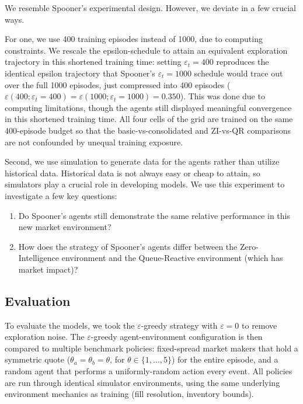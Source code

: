 \documentclass{article}
\begin{document}
We resemble Spooner's experimental design. However, we deviate in a few crucial ways.

For one, we use 400 training episodes instead of 1000, due to computing constraints. We rescale the epsilon-schedule to attain an equivalent exploration trajectory in this shortened training time: setting $\varepsilon_t = 400$ reproduces the identical epsilon trajectory that Spooner's $\varepsilon_t = 1000$ schedule would trace out over the full 1000 episodes, just compressed into 400 episodes ($\varepsilon(400;\varepsilon_t{=}400) = \varepsilon(1000;\varepsilon_t{=}1000) = 0.350$). This was done due to computing limitations, though the agents still displayed meaningful convergence in this shortened training time. All four cells of the grid are trained on the same 400-episode budget so that the basic-vs-consolidated and ZI-vs-QR comparisons are not confounded by unequal training exposure.

Second, we use simulation to generate data for the agents rather than utilize historical data. Historical data is not always easy or cheap to attain, so simulators play a crucial role in developing models. We use this experiment to investigate a few key questions:
\begin{enumerate}
  \item Do Spooner's agents still demonstrate the same relative performance in this new market environment?
  \item How does the strategy of Spooner's agents differ between the Zero-Intelligence environment and the Queue-Reactive environment (which has market impact)?
\end{enumerate}

\subsection{Evaluation}

To evaluate the models, we took the $\varepsilon$-greedy strategy with $\varepsilon = 0$ to remove exploration noise. The $\varepsilon$-greedy agent-environment configuration is then compared to multiple benchmark policies: fixed-spread market makers that hold a symmetric quote ($\theta_a = \theta_b = \theta$, for $\theta \in \{1,\dots,5\}$) for the entire episode, and a random agent that performs a uniformly-random action every event. All policies are run through identical simulator environments, using the same underlying environment mechanics as training (fill resolution, inventory bounds).
\end{document}
